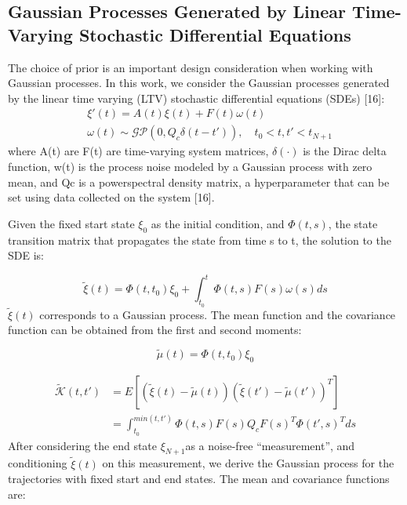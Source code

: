 \documentclass{IEEEtran}
\begin{document}
\subsection{Gaussian Processes Generated by Linear Time-Varying
Stochastic Differential Equations}
The choice of prior is an important design consideration
when working with Gaussian processes. In this work, we
consider the Gaussian processes generated by the linear time
varying (LTV) stochastic differential equations (SDEs) [16]:
\begin{equation}
\begin{split}
&\xi'(t)=A(t)\xi(t)+F(t)\omega(t)\\
&\omega(t)\sim{\mathcal{GP}(0,{Q_c\delta(t-t')})},\quad t_0<t,t'<t_{N+1}
\end{split}
\end{equation}
where A(t) are F(t) are time-varying system matrices, $\delta(\cdot)$
is the Dirac delta function, w(t) is the process noise modeled
by a Gaussian process with zero mean, and Qc is a powerspectral density matrix, a hyperparameter that can be set
using data collected on the system [16].

Given the fixed start state $\xi_0$ as the initial condition, and
$\Phi(t, s)$, the state transition matrix that propagates the state
from time s to t, the solution to the SDE is:

\begin{equation}
\tilde{\xi}(t)=\Phi(t,{t_0}){\xi_0}+\int_{t_0}^{t}\Phi(t,s)F(s)\omega(s)ds
\end{equation}
$\tilde{\xi}(t)$ corresponds to a Gaussian process. The mean function
and the covariance function can be obtained from the first
and second moments:

\begin{equation}
\tilde{\mu}(t)=\Phi(t,{t_0}){\xi_0}
\end{equation}

\begin{equation}
\begin{split}
\tilde{\mathcal{K}}(t,t')&=E[(\tilde{\xi}(t)-\tilde{\mu}(t)){(\tilde{\xi}(t')-\tilde{\mu}(t'))}^T]\\
&=\int_{t_0}^{min(t,t')}\Phi(t,s)F(s)Q_c{F(s)}^T{\Phi(t',s)}^Tds
\end{split}
\end{equation}
After considering the end state $\xi_{N+1}$as a noise-free “measurement”, and conditioning $\tilde{\xi}(t)$ on this measurement, we
derive the Gaussian process for the trajectories with fixed
start and end states. The mean and covariance functions are:
\end{document}
